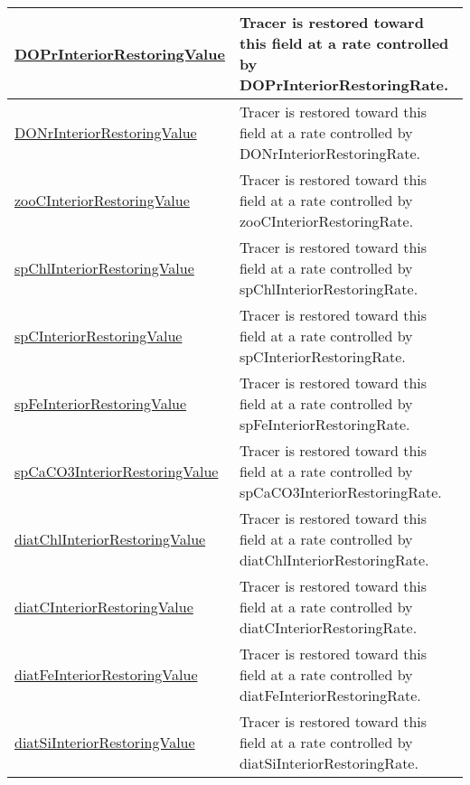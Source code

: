 {\begin{center}
\begin{longtable}{| p{2.0in} | p{4.0in} |}
    \hline
    \hyperref[subsec:var_sec_forcing_DOPrInteriorRestoringValue]{DOPrInteriorRestoringValue} & Tracer is restored toward this field at a rate controlled by DOPrInteriorRestoringRate. \\
    \hline
    \hyperref[subsec:var_sec_forcing_DONrInteriorRestoringValue]{DONrInteriorRestoringValue} & Tracer is restored toward this field at a rate controlled by DONrInteriorRestoringRate. \\
    \hline
    \hyperref[subsec:var_sec_forcing_zooCInteriorRestoringValue]{zooCInteriorRestoringValue} & Tracer is restored toward this field at a rate controlled by zooCInteriorRestoringRate. \\
    \hline
    \hyperref[subsec:var_sec_forcing_spChlInteriorRestoringValue]{spChlInteriorRestoringValue} & Tracer is restored toward this field at a rate controlled by spChlInteriorRestoringRate. \\
    \hline
    \hyperref[subsec:var_sec_forcing_spCInteriorRestoringValue]{spCInteriorRestoringValue} & Tracer is restored toward this field at a rate controlled by spCInteriorRestoringRate. \\
    \hline
    \hyperref[subsec:var_sec_forcing_spFeInteriorRestoringValue]{spFeInteriorRestoringValue} & Tracer is restored toward this field at a rate controlled by spFeInteriorRestoringRate. \\
    \hline
    \hyperref[subsec:var_sec_forcing_spCaCO3InteriorRestoringValue]{spCaCO3InteriorRestoringValue} & Tracer is restored toward this field at a rate controlled by spCaCO3InteriorRestoringRate. \\
    \hline
    \hyperref[subsec:var_sec_forcing_diatChlInteriorRestoringValue]{diatChlInteriorRestoringValue} & Tracer is restored toward this field at a rate controlled by diatChlInteriorRestoringRate. \\
    \hline
    \hyperref[subsec:var_sec_forcing_diatCInteriorRestoringValue]{diatCInteriorRestoringValue} & Tracer is restored toward this field at a rate controlled by diatCInteriorRestoringRate. \\
    \hline
    \hyperref[subsec:var_sec_forcing_diatFeInteriorRestoringValue]{diatFeInteriorRestoringValue} & Tracer is restored toward this field at a rate controlled by diatFeInteriorRestoringRate. \\
    \hline
    \hyperref[subsec:var_sec_forcing_diatSiInteriorRestoringValue]{diatSiInteriorRestoringValue} & Tracer is restored toward this field at a rate controlled by diatSiInteriorRestoringRate. \\

\end{longtable}
\end{center}}
